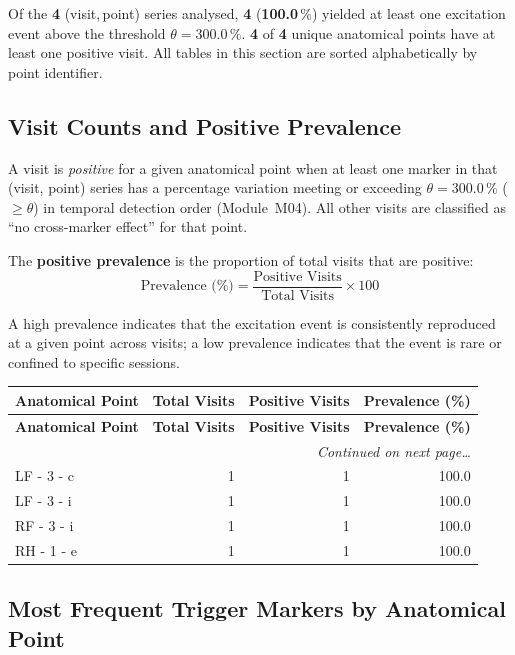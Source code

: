 \documentclass[a4paper,11pt]{article}
\begin{document}
\noindent
Of the \textbf{4} (visit,\,point) series analysed,
\textbf{4} (\textbf{100.0}\,\%) yielded at least one
excitation event above the threshold $\theta = 300.0\,\%$.
\textbf{4} of \textbf{4} unique anatomical points
have at least one positive visit.
All tables in this section are sorted alphabetically by point identifier.

\subsection{Visit Counts and Positive Prevalence}

A visit is \emph{positive} for a given anatomical point when at least one marker in that
(visit, point) series has a percentage variation meeting or exceeding
$\theta = 300.0\,\%$ ($\geq \theta$) in temporal detection order (Module~M04).
All other visits are classified as ``no cross-marker effect'' for that point.

The \textbf{positive prevalence} is the proportion of total visits that are positive:
\[
  \text{Prevalence (\%)} = \frac{\text{Positive Visits}}{\text{Total Visits}} \times 100
\]

A high prevalence indicates that the excitation event is consistently reproduced at a given
point across visits; a low prevalence indicates that the event is rare or confined to
specific sessions.

\begin{small}
\begin{longtable}{p{5cm}rrr}
\toprule
\textbf{Anatomical Point} &
\textbf{Total Visits} &
\textbf{Positive Visits} &
\textbf{Prevalence (\%)} \\
\midrule
\endfirsthead
\toprule
\textbf{Anatomical Point} &
\textbf{Total Visits} &
\textbf{Positive Visits} &
\textbf{Prevalence (\%)} \\
\midrule
\endhead
\midrule
\multicolumn{4}{r}{\small\emph{Continued on next page\ldots}} \\
\endfoot
\bottomrule
\endlastfoot
LF - 3 - c & 1 & 1 & 100.0 \\
LF - 3 - i & 1 & 1 & 100.0 \\
RF - 3 - i & 1 & 1 & 100.0 \\
RH - 1 - e & 1 & 1 & 100.0 \\
\end{longtable}
\end{small}

\subsection{Most Frequent Trigger Markers by Anatomical Point}
\end{document}
